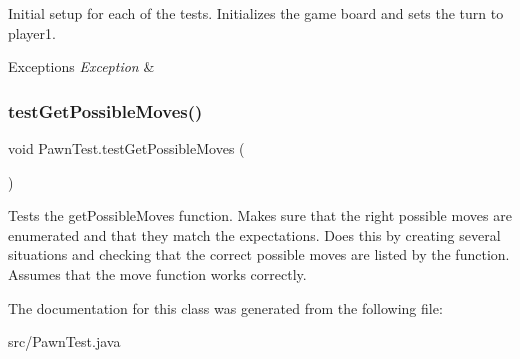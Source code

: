 Initial setup for each of the tests. Initializes the game board and sets the turn to player1. 
\begin{DoxyExceptions}{Exceptions}
{\em Exception} & \\
\hline
\end{DoxyExceptions}
\mbox{\label{class_pawn_test_a2d7ccbcea2dc38ab62a43f4b0f1fc01b}} 
\subsubsection{\texorpdfstring{test\+Get\+Possible\+Moves()}{testGetPossibleMoves()}}
{\footnotesize\ttfamily void Pawn\+Test.\+test\+Get\+Possible\+Moves (\begin{DoxyParamCaption}{ }\end{DoxyParamCaption})}

Tests the get\+Possible\+Moves function. Makes sure that the right possible moves are enumerated and that they match the expectations. Does this by creating several situations and checking that the correct possible moves are listed by the function. Assumes that the move function works correctly. 

The documentation for this class was generated from the following file\+:\begin{DoxyCompactItemize}
\item 
src/Pawn\+Test.\+java\end{DoxyCompactItemize}
